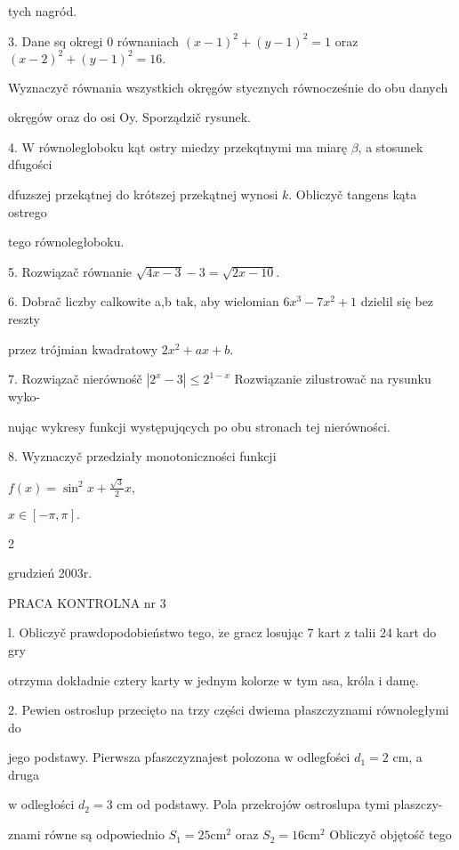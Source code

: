 \documentclass[a4paper,12pt]{article}
\begin{document}
tych nagród.

3. Dane sq okregi $0$ równaniach $(x-1)^{2}+(y-1)^{2}=1$ oraz $(x-2)^{2}+(y-1)^{2}=16.$

Wyznaczyč równania wszystkich okręgów stycznych równocześnie do obu danych

okręgów oraz do osi Oy. Sporządzič rysunek.

4. $\mathrm{W}$ równolegloboku kąt ostry miedzy przekqtnymi ma miarę $\beta$, a stosunek dfugości

dfuzszej przekątnej do krótszej przekątnej wynosi $k$. Obliczyč tangens kąta ostrego

tego równoległoboku.

5. Rozwiązač równanie $\sqrt{4x-3}-3=\sqrt{2x-10}.$

6. Dobrač liczby calkowite a,b $\mathrm{t}\mathrm{a}\mathrm{k}$, aby wielomian $6x^{3}-7x^{2}+1$ dzielil się bez reszty

przez trójmian kwadratowy $2x^{2}+ax+b.$

7. Rozwiązač nierównośč $|2^{x}-3|\leq 2^{1-x}$ Rozwiązanie zilustrowač na rysunku wyko-

nując wykresy funkcji występujqcych po obu stronach tej nierówności.

8. Wyznaczyč przedziały monotoniczności funkcji

$f(x)=\displaystyle \sin^{2}x+\frac{\sqrt{3}}{2}x,$

$x\in[-\pi,\pi].$

2





grudzień 2003r.

PRACA KONTROLNA nr 3

l. Obliczyč prawdopodobieństwo tego, $\dot{\mathrm{z}}\mathrm{e}$ gracz losując 7 kart $\mathrm{z}$ talii 24 kart do gry

otrzyma dokładnie cztery karty $\mathrm{w}$ jednym kolorze $\mathrm{w}$ tym asa, króla $\mathrm{i}$ damę.

2. Pewien ostroslup przecięto na trzy części dwiema płaszczyznami równoległymi do

jego podstawy. Pierwsza pfaszczyznajest polozona $\mathrm{w}$ odlegfości $d_{1}=2$ cm, a druga

$\mathrm{w}$ odległości $d_{2}=3$ cm od podstawy. Pola przekrojów ostroslupa tymi plaszczy-

znami równe są odpowiednio $S_{1}=25\mathrm{c}\mathrm{m}^{2}$ oraz $S_{2}=16\mathrm{c}\mathrm{m}^{2}$ Obliczyč objętośč tego
\end{document}
